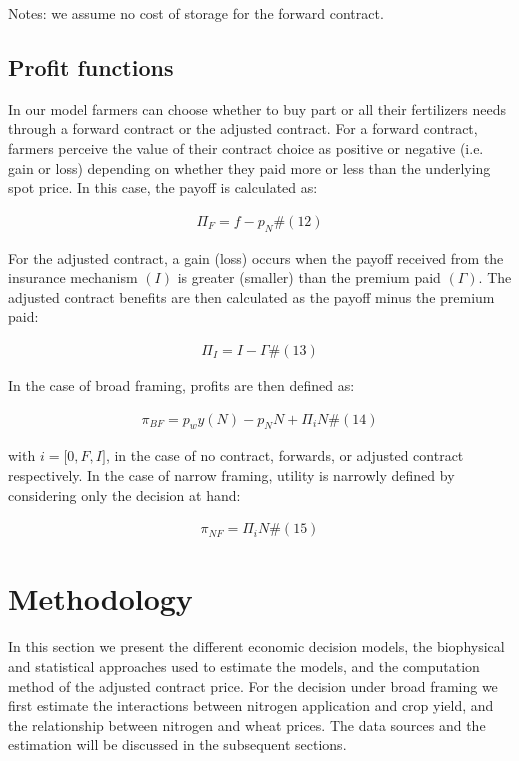 \documentclass[
]{article}
\begin{document}
Notes: we assume no cost of storage for the forward contract.

\subsection{Profit functions}\label{profit-functions}

In our model farmers can choose whether to buy part or all their
fertilizers needs through a forward contract or the adjusted contract.
For a forward contract, farmers perceive the value of their contract
choice as positive or negative (i.e. gain or loss) depending on whether
they paid more or less than the underlying spot price. In this case, the
payoff is calculated as:

\[\begin{array}{r}
\Pi_{F} = f - p_{N}\#(12)
\end{array}\]

For the adjusted contract, a gain (loss) occurs when the payoff received
from the insurance mechanism \((I)\) is greater (smaller) than the
premium paid \((\Gamma)\). The adjusted contract benefits are then
calculated as the payoff minus the premium paid:

\[\begin{array}{r}
\Pi_{I} = I - \Gamma\#(13)
\end{array}\]

In the case of broad framing, profits are then defined as:

\[\begin{array}{r}
\pi_{BF} = p_{w}y(N) - p_{N}N + \Pi_{i}N\#(14)
\end{array}\]

with \(i = \lbrack 0,F,I\rbrack\), in the case of no contract, forwards,
or adjusted contract respectively. In the case of narrow framing,
utility is narrowly defined by considering only the decision at hand:

\[\begin{array}{r}
\pi_{NF} = \Pi_{i}N\#(15)
\end{array}\]

\section{Methodology}\label{methodology}

In this section we present the different economic decision models, the
biophysical and statistical approaches used to estimate the models, and
the computation method of the adjusted contract price. For the decision
under broad framing we first estimate the interactions between nitrogen
application and crop yield, and the relationship between nitrogen and
wheat prices. The data sources and the estimation will be discussed in
the subsequent sections.
\end{document}
